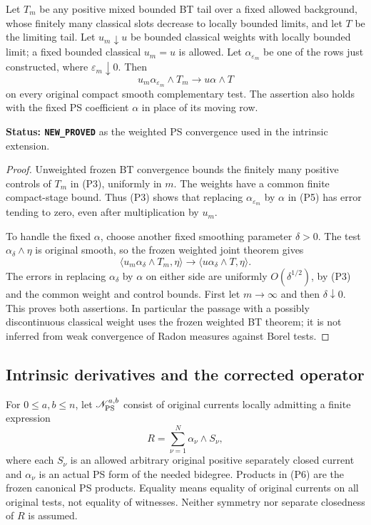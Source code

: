 \begin{lemma}
\label{lem:r10-weighted-pws-moving-tails}
Let $T_m$ be any positive mixed bounded BT tail over a fixed
allowed background, whose finitely many classical slots decrease
to locally bounded limits, and let $T$ be the limiting tail.
Let $u_m\downarrow u$ be bounded classical weights with locally
bounded limit; a fixed bounded classical $u_m=u$ is allowed.
Let $\alpha_{\varepsilon_m}$ be one of the rows just constructed,
where $\varepsilon_m\downarrow0$.  Then
\[
             u_m\alpha_{\varepsilon_m}\wedge T_m
                          \longrightarrow u\alpha\wedge T
 \tag{P5}
\]
on every original compact smooth complementary test.
The assertion also holds with the fixed PS coefficient $\alpha$
in place of its moving row.
\end{lemma}

\noindent\textbf{Status: \texttt{NEW\_PROVED}} as the
weighted PS convergence used in the intrinsic extension.

\begin{proof}
Unweighted frozen BT convergence bounds the finitely many
positive controls of $T_m$ in (P3), uniformly in $m$.
The weights have a common finite compact-stage bound.
Thus (P3) shows that replacing
$\alpha_{\varepsilon_m}$ by $\alpha$ in (P5) has error tending
to zero, even after multiplication by $u_m$.

To handle the fixed $\alpha$, choose another fixed smoothing
parameter $\delta>0$.  The test
$\alpha_\delta\wedge\eta$ is original smooth, so the frozen
weighted joint theorem gives
\[
 \langle u_m\alpha_\delta\wedge T_m,\eta\rangle
                  \longrightarrow
 \langle u\alpha_\delta\wedge T,\eta\rangle.
\]
The errors in replacing $\alpha_\delta$ by $\alpha$ on either
side are uniformly $O(\delta^{1/2})$, by (P3) and the common
weight and control bounds.  First let $m\to\infty$ and then
$\delta\downarrow0$.  This proves both assertions.  In
particular the passage with a possibly discontinuous classical
weight uses the frozen weighted BT theorem; it is not inferred
from weak convergence of Radon measures against Borel tests.
\end{proof}

\subsection{Intrinsic derivatives and the corrected operator}

\begin{definition}
\label{def:r10-full-pws-background-module}
For $0\le a,b\le n$, let $\mathscr N_{\rm PS}^{a,b}$ consist
of original currents locally admitting a finite expression
\[
                         R=\sum_{\nu=1}^N\alpha_\nu\wedge S_\nu,
 \tag{P6}
\]
where each $S_\nu$ is an allowed arbitrary original positive
separately closed current and $\alpha_\nu$ is an actual PS form
of the needed bidegree.  Products in (P6) are the frozen
canonical PS products.  Equality means equality of original
currents on all original tests, not equality of witnesses.
Neither symmetry nor separate closedness of $R$ is assumed.
\end{definition}

